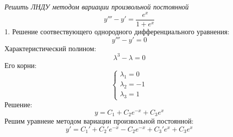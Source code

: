 \documentclass[a5paper, 10pt]{article}
\theoremstyle{definition}
\theoremstyle{plain}
\theoremstyle{remark}
\begin{document}
\section{}
\textit{Решить ЛНДУ методом вариации произвольной постоянной}
\\
\begin{equation}
y''' -y' = \frac{e^x}{1+e^x}
\end{equation}
1. Решение соотвествующего однородного дифференциального уравнения:
\begin{equation}
y''' -y' = 0
\end{equation}
Характеристический полином:
\begin{equation}
\lambda^3 -\lambda = 0
\end{equation}
Его корни:
\begin{equation}
\begin{cases}
\lambda_1 = 0\\
\lambda_2 = -1\\
\lambda_3 = 1
\end{cases}
\end{equation}
Решение:
\begin{equation}
y = C_1 + C_2e^{-x} + C_3 e^{x}
\end{equation}
Решим уравнеие методом вариации произвольной постоянной:
\begin{equation}
y' = C_1' + C_2'e^{-x} -C_2e^{-x} + C_3' e^{x}+ C_3 e^{x}
\end{equation}
\end{document}
